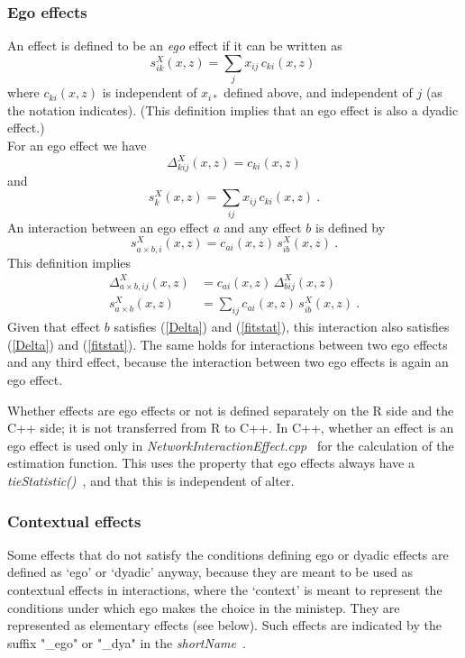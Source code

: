\documentclass[a4paper,12pt,fleqn]{article}
\newcommand{\nnm}[1]{\textsf{\small\textit{#1}\ }}
\begin{document}
\subsubsection{Ego effects}
\label{S_ego}

An effect is defined to be an \emph{ego} effect if it can be written as
\begin{equation}
 s_{ik}^X(x,z) = \sum_j x_{ij}\, c_{ki}(x,z) \        \label{ego}
\end{equation}
where $c_{ki}(x,z)$ is independent of $x_{i\ast}$ defined above,
and independent of $j$ (as the notation indicates).
(This definition implies that an ego effect is also a dyadic effect.)
\\
For an ego effect we have
\[
 \Delta_{kij}^X(x,z) = c_{ki}(x,z)
\]
and
\[
   s_{k}^X(x,z) = \sum_{ij} x_{ij}\, c_{ki}(x,z) \ .
\]
An interaction between an ego effect $a$ and any effect $b$ is defined by
\begin{equation}
 s_{a \times b,i}^X(x,z) =  c_{ai}(x,z) \, s_{ib}^X(x,z)  \ .        \label{ego_inter}
\end{equation}
This definition implies
\begin{align*}
 \Delta_{a \times b,ij}^X(x,z) &= c_{ai}(x,z)\, \Delta_{bij}^X(x,z)   \\
   s_{a \times b}^X(x,z) &= \sum_{ij}  c_{ai}(x,z)\, s_{ib}^X(x,z) \ .
\end{align*}
Given that effect $b$ satisfies (\ref{Delta}) and (\ref{fitstat}),
this interaction also satisfies (\ref{Delta}) and (\ref{fitstat}).
The same holds for interactions between two ego effects and
any third effect, because the interaction between two ego effects is again
an ego effect.

Whether effects are ego effects or not is defined separately on the R side
and the C++ side; it is not transferred from R to C++.
In C++, whether an effect is an ego effect is used only in
\nnm{NetworkInteractionEffect.cpp} for the calculation of the
estimation function.
This uses the property that ego effects always have a \nnm{tieStatistic()},
and that this is independent of alter.

\subsubsection{Contextual effects}

Some effects that do not satisfy the conditions defining ego or dyadic effects
are defined as `ego' or `dyadic' anyway, because they are meant to be used
as contextual effects in interactions, where the `context' is meant to
represent the conditions under which ego makes the choice in the ministep.
They are represented as elementary effects (see below).
Such effects are indicated by the suffix "\_ego" or "\_dya" in the
\nnm{shortName}.
\end{document}
